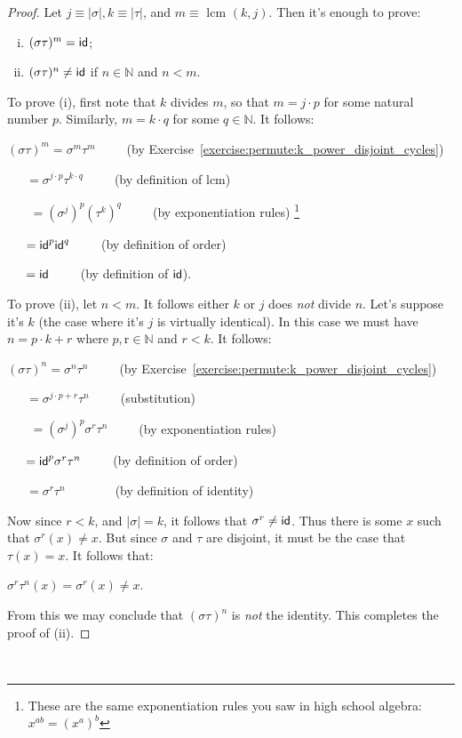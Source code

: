 \begin{proof}  Let  $j \equiv |\sigma|, k \equiv |\tau|$, and $m \equiv \mbox{ lcm }(k,j)$. Then it's enough to prove:
\begin{enumerate}[(i)]
\item
$(\sigma \tau)^m = {\sf{i}d} $;
\item
$(\sigma \tau)^n \neq {\sf{i}d} $ if $n \in \mathbb{N}$ and $n < m$.
\end{enumerate}

\noindent
To prove (i), first note that $k$ divides $m$, so that $m = j \cdot p$ for some natural number $p$. Similarly, $m = k \cdot q$ for some $q \in \mathbb{N}$. It follows:

\noindent
$(\sigma \tau )^m = \sigma^m \tau^m$~~~~~(by Exercise~\ref{exercise:permute:k_power_disjoint_cycles})

~~~$=  \sigma^{j \cdot p} \tau^{ k \cdot q}$~~~~~(by definition of lcm)

~~~ $=  (\sigma^j)^p (\tau^ k)^q$~~~~~(by exponentiation rules)
\footnote{These are the same exponentiation rules you saw in high school algebra:  $x^{ab} = (x^a)^b$}

~~~$=   {\sf{i}d} ^p {\sf{i}d} ^q$~~~~~(by definition of order)

~~~$ = {\sf{i}d} $~~~~~(by definition of ${\sf{i}d} $).
\medskip

\noindent
To prove (ii), let $n < m$. It follows either $k$ or $j$ does \emph{not} divide $n$. Let's suppose it's $k$ (the case where it's $j$ is virtually identical). In this case we must have $n = p \cdot k + r$ where $p, $r$ \in \mathbb{N}$ and $r < k$. It follows:

\noindent
$(\sigma \tau )^n = \sigma^n \tau^n$~~~~~(by Exercise~\ref{exercise:permute:k_power_disjoint_cycles})

~~~$=  \sigma^{j \cdot p + r} \tau^n$~~~~~(substitution)

~~~ $=  (\sigma^j)^p \sigma^r \tau^n $~~~~~(by exponentiation rules)

~~~$=   {\sf{i}d} ^p \sigma^r \tau^n $~~~~~(by definition of order)

~~~$=   \sigma^r \tau^n $~~~~~~~~(by definition of identity)
\medskip

Now since $r < k$, and $|\sigma| = k$,  it follows that $\sigma^r \neq {\sf{i}d} $. Thus there is some $x$ such that $\sigma^r(x) \neq x$. But since $\sigma$ and $\tau$ are disjoint, it must be the case that $\tau(x) = x$. It follows that:
\medskip

$\sigma^r \tau^n (x) = \sigma^r (x) \neq x$. 
\medskip

\noindent
From this we may conclude that $(\sigma \tau )^n$ is \emph{not} the identity. This completes the proof of (ii).
\end{proof}\
\medskip

